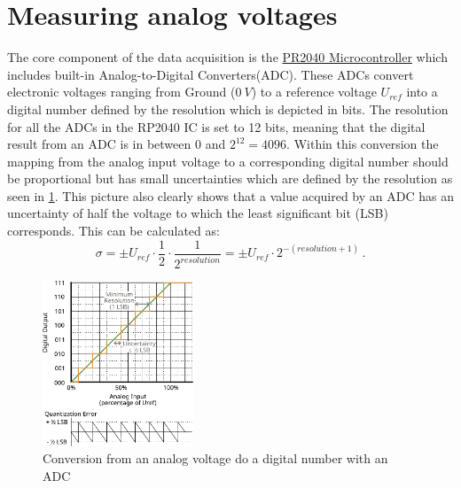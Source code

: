 \section{Measuring analog voltages}

The core component of the data acquisition is the \href{https://www.raspberrypi.com/documentation/microcontrollers/rp2040.html}{PR2040 Microcontroller} which includes built-in Analog-to-Digital Converters(ADC). These ADCs convert electronic voltages ranging from Ground ($\SI{0}{V}$) to a reference voltage $U_{ref}$ into a digital number defined by the resolution which is depicted in bits. The resolution for all the ADCs in the RP2040 IC is set to 12 bits, meaning that the digital result from an ADC is in between $0$ and $2^{12} = 4096$. Within this conversion the mapping from the analog input voltage to a corresponding digital number should be proportional but has small uncertainties which are defined by the resolution as seen in \cref{fig:ADC-Curve}. This picture also clearly shows that a value acquired by an ADC has an uncertainty of half the voltage to which the least significant bit (LSB) corresponds. This can be calculated as:
\begin{equation*}
	\sigma = \pm{} U_{ref} \cdot \frac{1}{2} \cdot \frac{1}{2^{resolution}} = \pm{} U_{ref} \cdot 2^{-(resolution + 1)}\,.
\end{equation*}

\begin{figure}[htb]
		\centering
		\includegraphics[width=0.4\textwidth]{./fig/ADC-conversion-curve-export.pdf}
		\caption{Conversion from an analog voltage do a digital number with an ADC}
		\label{fig:ADC-Curve}
\end{figure}

